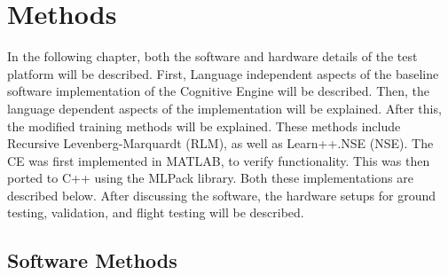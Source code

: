 \chapter{Methods}
\par In the following chapter, both the software and hardware details of the test platform will be described. First, Language independent aspects of the baseline software implementation of the Cognitive Engine will be described. Then, the language dependent aspects of the implementation will be explained. After this, the modified training methods will be explained. These methods include Recursive Levenberg-Marquardt (RLM), as well as Learn++.NSE (NSE). The CE was first implemented in MATLAB, to verify functionality. This was then ported to C++ using the MLPack library. Both these implementations are described below. After discussing the software, the hardware setups for ground testing, validation, and flight testing will be described.
\section{Software Methods}


